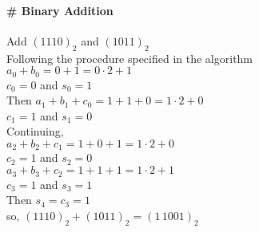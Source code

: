 \documentclass[12pt,oneside,a4paper]{book}
\theoremstyle{remark}
\theoremstyle{definition}
\begin{document}
\paragraph{\# Binary Addition} Add \((1110)_2\) and \((1011)_2\)\\
Following the procedure specified in the algorithm\\
\(a_0+b_0=0+1=0\cdot2+1\)\\
\(c_0=0\) and \(s_0=1\)\\
Then \(a_1+b_1+c_0=1+1+0=1\cdot2+0\)\\
\(c_1=1\) and \(s_1=0\)\\
Continuing,\\
\(a_2+b_2+c_1=1+0+1=1\cdot2+0\)\\
\(c_2=1\) and \(s_2=0\)\\
\(a_3+b_3+c_2=1+1+1=1\cdot2+1\)\\
\(c_3=1\) and \(s_3=1\)\\
Then \(s_4=c_3=1\)\\
so, \((1110)_2+(1011)_2=(1\,1001)_2\)
\end{document}
